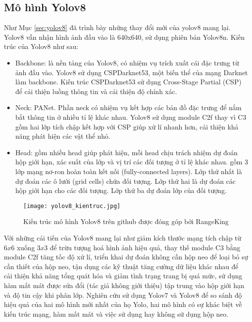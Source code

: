 \documentclass[../the.tex]{subfiles}
\begin{document}
\subsection{Mô hình Yolov8}
{\fontsize{13}{12} \selectfont

	Như Mục \ref{sec:yolov8} đã trình bày những thay đổi mới của yolov8 mang lại. Yolov8 vẫn nhận hình ảnh đầu vào là 640x640, sử dụng phiên bản Yolov8n. Kiến trúc của Yolov8 như sau:
	\begin{itemize}
		\item Backbone: là nền tảng của Yolov8, có nhiệm vụ trích xuất cái đặc trưng từ ảnh đầu vào. Yolov8 sử dụng CSPDarknet53, một biến thể của mạng Darknet làm backbone.
		      Kiến trúc CSPDarknet53 sử dụng Cross-Stage Partial (CSP) để cải thiện luồng thông tin và cải thiện độ chính xác.
		\item Neck: PANet. Phần neck có nhiệm vụ kết hợp các bản đồ đặc trưng để nắm bắt thông tin ở nhiều tỉ lệ khác nhau. Yolov8 sử dụng module C2f thay vì C3 gồm hai lớp tích chập kết hợp với CSP giúp xử lí nhanh hơn, cải thiện khả năng phát hiện các vật thể nhỏ.
		\item Head: gồm nhiều head giúp phát hiện, mỗi head chịu trách nhiệm dự đoán hộp giới hạn, xác suất của lớp và vị trí các đối tượng ở tỉ lệ  khác nhau.
		      gồm 3 lớp mạng nơ-ron hoàn toàn kết nối
		      (fully-connected layers). Lớp thứ nhất
		      là dự đoán các ô lưới (grid cells) chứa đối
		      tượng. Lớp thứ hai là dự đoán các hộp giới hạn cho các đối tượng. Lớp thứ ba dự đoán lớp của đối tượng.
	\end{itemize}

}

\begin{figure}[H]
	\centering
	\texttt{[image: yolov8\_kientruc.jpg]}
	\caption{Kiến trúc mô hình Yolov8 trên github được đóng góp bởi RangeKing}
	\label{fig:yolo8_kientruc}
\end{figure}

{\fontsize{13}{12} \selectfont

Với những cải tiến của Yolov8 mang lại như giảm kích thước mạng tích chập từ $6x6$ xuống $3x3$ để trừu tượng hoá hình ảnh hiệu quả, thay thế module C3 bằng module C2f tăng tốc độ xử lí, triển khai dự đoán không cần hộp neo để loại bỏ sự cần thiết của hộp neo,
tận dụng các kỹ thuật tăng cường dữ liệu khác nhau để cải thiện khả năng tổng quát hóa và giảm tình trạng trang bị quá mức, sử dụng hàm mất mát được sửa đổi (tác giả không giới thiệu) tập trung vào hộp giới hạn và độ tin cậy khi phân lớp.
Nghiên cứu sử dụng Yolov7 và Yolov8 để so sánh độ hiệu quả của hai mô hình mới nhất của họ Yolo, hai mô hình có sự khác biệt về kiến trúc mạng, hàm mất mát và việc sử dụng hay không sử dụng hộp neo.

}
\end{document}
